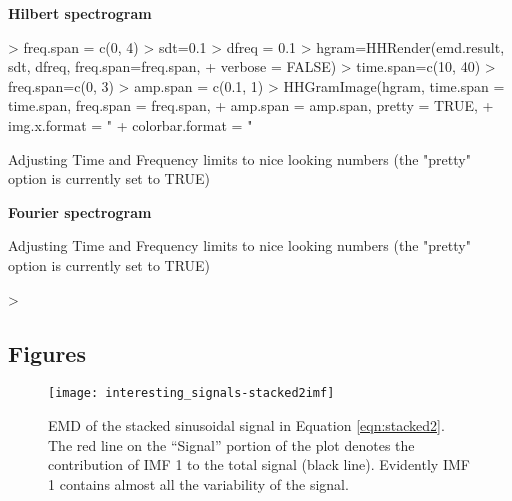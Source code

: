 \documentclass[12pt]{article}
\begin{document}
\textbf{Hilbert spectrogram}
\begin{Schunk}
\begin{Sinput}
> freq.span = c(0, 4)
> sdt=0.1
> dfreq = 0.1
> hgram=HHRender(emd.result, sdt, dfreq, freq.span=freq.span, 
+    verbose = FALSE)
> time.span=c(10, 40)
> freq.span=c(0, 3)
> amp.span = c(0.1, 1)
> HHGramImage(hgram, time.span = time.span, freq.span = freq.span,
+     amp.span = amp.span, pretty = TRUE,
+     img.x.format = "%.0f", img.y.format = "%.0f",
+     colorbar.format = "%.0f", trace.format = "%.1f")
\end{Sinput}
\begin{Soutput}
Adjusting Time and Frequency limits to nice looking numbers (the "pretty" option is currently set to TRUE)
\end{Soutput}
\end{Schunk}

\textbf{Fourier spectrogram}
\begin{Schunk}
\begin{Soutput}
Adjusting Time and Frequency limits to nice looking numbers (the "pretty" option is currently set to TRUE)
\end{Soutput}
\begin{Sinput}
> 
\end{Sinput}
\end{Schunk}

\subsection{Figures}

\FloatBarrier

\begin{figure}[ht]
\begin{center}
\texttt{[image: interesting\_signals-stacked2imf]}
\end{center}
\caption{EMD of the stacked sinusoidal signal in Equation \ref{eqn:stacked2}.
The red line on the ``Signal'' portion of the plot denotes the contribution of IMF 1 to the total signal (black line).
Evidently IMF 1 contains almost all the variability of the signal.}
\label{fig:stacked2imf}
\end{figure}
\end{document}
